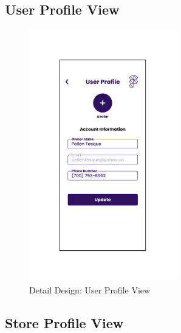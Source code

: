 \documentclass[../thesis.tex]{subfiles}
\begin{document}
\subsection{User Profile View}

\begin{figure}[H]
    \centering
    \includegraphics[width=0.57\textwidth]{images/DetailedDesign_UserProfile.png}
    \caption{Detail Design: User Profile View}
    \label{fig:DetailedDesign_UserProfile}
\end{figure}

\subsection{Store Profile View}
\end{document}
